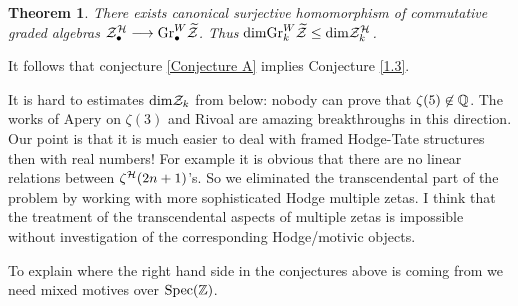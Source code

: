 \documentclass[10pt]{article}
\newtheorem{theorem}{Theorem}[section]
\begin{document}
\begin{theorem} \label{3.6.01.1} There exists canonical surjective homomorphism of commutative graded algebras ${\cal Z}^{\cal H}_{\bullet} \longrightarrow {\rm Gr}_{\bullet}^W \widetilde 
{\cal Z}$. Thus  ${\rm dim} {\rm Gr}_k^W \widetilde {\cal Z}\leq 
{\rm dim} {\cal Z}^{\cal H}_k $. 
\end{theorem}

It follows that conjecture \ref{Conjecture A} implies Conjecture \ref{1.3}. 


It is hard to estimates ${\rm dim}   {\cal
Z}_{k}$ from below: nobody can  prove that  
${ \zeta}(5) \not \in {\mathbb Q}$. The works of Apery on $\zeta(3)$ and Rivoal  
are amazing  breakthroughs in this direction. 
Our point is that 
it is much easier to deal with  framed 
Hodge-Tate structures then with real numbers! For example it is obvious that 
there are no linear relations between 
$\zeta^{\cal H}(2n+1)$'s.  So we eliminated the transcendental part of the problem by  working
with more  sophisticated   Hodge multiple zetas. I think that 
the  treatment of the transcendental aspects of multiple zetas is impossible without 
  investigation of the corresponding Hodge/motivic objects. 


To explain where the right hand side  in the conjectures above is coming from 
we need  mixed motives over ${\rm Spec}({\mathbb Z})$. 
\end{document}
